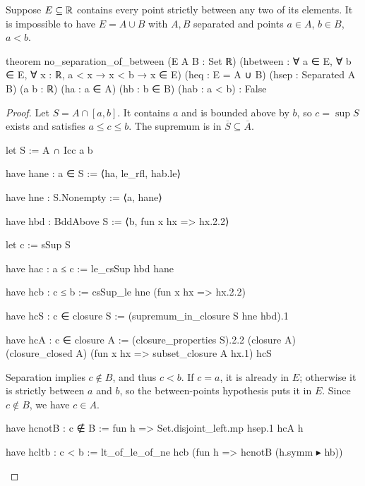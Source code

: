 \begin{lemma}
  \label{an1:lem:no-separation-of-between}
  Suppose $E\subseteq\mathbb{R}$ contains every point strictly between any two of its elements.
  It is impossible to have $E=A\cup B$ with $A,B$ separated and points $a\in A$, $b\in B$, $a<b$.

  \begin{lean}
    theorem no_separation_of_between (E A B : Set ℝ)
        (hbetween : ∀ a ∈ E, ∀ b ∈ E, ∀ x : ℝ, a < x → x < b → x ∈ E)
        (heq : E = A ∪ B) (hsep : Separated A B)
        (a b : ℝ) (ha : a ∈ A) (hb : b ∈ B) (hab : a < b) : False
  \end{lean}
\end{lemma}

\begin{proof}
  Let $S=A\cap[a,b]$.
  It contains $a$ and is bounded above by $b$, so $c=\sup S$ exists and satisfies $a\leq c\leq b$.
  The supremum is in $\overline S\subseteq\overline A$.

  \begin{lean}
    let S := A ∩ Icc a b

    have hane : a ∈ S := ⟨ha, le_rfl, hab.le⟩

    have hne : S.Nonempty := ⟨a, hane⟩

    have hbd : BddAbove S := ⟨b, fun x hx => hx.2.2⟩

    let c := sSup S

    have hac : a ≤ c := le_csSup hbd hane

    have hcb : c ≤ b := csSup_le hne (fun x hx => hx.2.2)

    have hcS : c ∈ closure S := (supremum_in_closure S hne hbd).1

    have hcA : c ∈ closure A := (closure_properties S).2.2 (closure A)
      (closure_closed A) (fun x hx => subset_closure A hx.1) hcS
  \end{lean}

  Separation implies $c\notin B$, and thus $c<b$.
  If $c=a$, it is already in $E$; otherwise it is strictly between $a$ and $b$, so the
  between-points hypothesis puts it in $E$.
  Since $c\notin B$, we have $c\in A$.

  \begin{lean}
    have hcnotB : c ∉ B := fun h => Set.disjoint_left.mp hsep.1 hcA h

    have hcltb : c < b := lt_of_le_of_ne hcb (fun h => hcnotB (h.symm ▸ hb))


\end{lean}
\end{proof}
